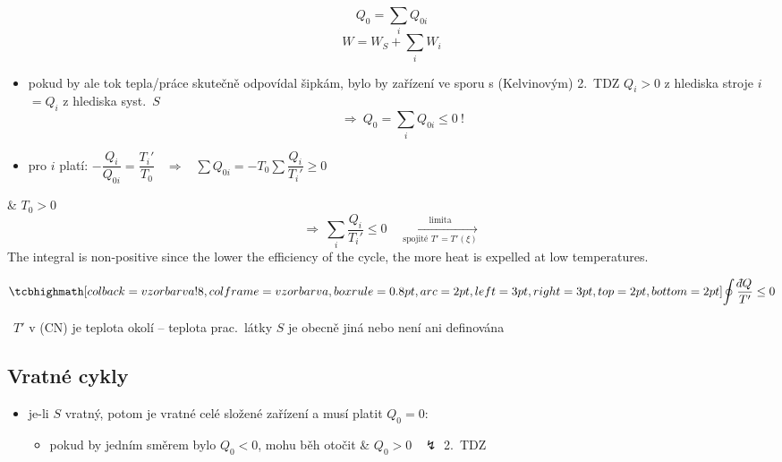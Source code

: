 \begin{minipage}{0.4\textwidth}
\centering
{}
\end{minipage}
\begin{minipage}{0.55\textwidth}
\[ Q_0 = \sum_i Q_{0i} \]
\[ W = W_S + \sum_i W_i \]
\end{minipage}

\begin{itemize}
  \item[$\to$] pokud by ale tok tepla/práce skutečně odpovídal šipkám, bylo by zařízení ve sporu s (Kelvinovým) 2.\ TDZ
  \hfill {\color{Red}\small $Q_i > 0$ z hlediska stroje \textcircled{$i$} $= Q_i$ z hlediska syst.\ \textcircled{$S$}}
  \[ \Rightarrow\ Q_0 = \sum_i Q_{0i} \leq 0\ ! \]
  \item[$\to$] pro \textcircled{$i$} platí: \quad $-\dfrac{Q_i}{Q_{0i}} = \dfrac{T_i'}{T_0}$ \ $\Rightarrow$ \
        $\sum Q_{0i} = -T_0\sum\dfrac{Q_i}{T_i'} \geq 0$
\end{itemize}

\& $T_0 > 0$
\[
  \Rightarrow\ \boxed{\sum_i\frac{Q_i}{T_i'} \leq 0}
  \quad\xrightarrow[\text{spojité } T' = T'(\xi)]{\text{limita}}
\]
{\color{Red}\small The integral is non-positive since the lower the efficiency of the cycle, the more heat is expelled at low temperatures.}
\begin{veta}
\[ \vzorec{\oint\frac{\dbar Q}{T'} \leq 0} \]
\end{veta}

\pozor{!}\ $T'$ v (CN) je teplota okolí -- teplota prac.\ látky \textcircled{$S$} je obecně jiná nebo není ani definována

\strana{L02-14}
\subsection*{Vratné cykly}
\begin{itemize}
  \item je-li \textcircled{$S$} vratný, potom je vratné celé složené zařízení a musí platit $Q_0 = 0$:
  \begin{itemize}[nosep]
    \item[$\to$] pokud by jedním směrem bylo $Q_0 < 0$, mohu běh otočit \& $Q_0 > 0$ \ $\lightning$ 2.\ TDZ
  \end{itemize}
\end{itemize}

